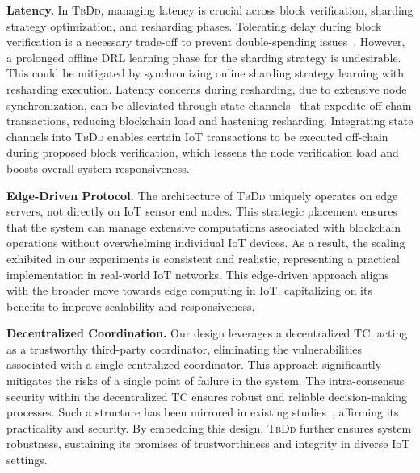 \noindent\textbf{Latency.}
In \textsc{TbDd}, managing latency is crucial across block verification, sharding strategy optimization, and resharding phases. Tolerating delay during block verification is a necessary trade-off to prevent double-spending issues~\cite{nakamoto2008bitcoin}. However, a prolonged offline DRL learning phase for the sharding strategy is undesirable. 
This could be mitigated by synchronizing online sharding strategy learning with resharding execution. Latency concerns during resharding, due to extensive node synchronization, can be alleviated through state channels~\cite{miller2019sprites} that expedite off-chain transactions, reducing blockchain load and hastening resharding.
Integrating state channels into \textsc{TbDd} enables certain IoT transactions to be executed off-chain during proposed block verification, which lessens the node verification load and boosts overall system responsiveness.

\smallskip
\noindent\textbf{Edge-Driven Protocol.}
The architecture of \textsc{TbDd} uniquely operates on edge servers, not directly on IoT sensor end nodes. This strategic placement ensures that the system can manage extensive computations associated with blockchain operations without overwhelming individual IoT devices. As a result, the scaling exhibited in our experiments is consistent and realistic, representing a practical implementation in real-world IoT networks. This edge-driven approach aligns with the broader move towards edge computing in IoT, capitalizing on its benefits to improve scalability and responsiveness.

\smallskip
\noindent\textbf{Decentralized Coordination.}
Our design leverages a decentralized TC, acting as a trustworthy third-party coordinator, eliminating the vulnerabilities associated with a single centralized coordinator. This approach significantly mitigates the risks of a single point of failure in the system. The intra-consensus security within the decentralized TC ensures robust and reliable decision-making processes. Such a structure has been mirrored in existing studies~\cite{luu2016secure, kokoris2018omniledger}, affirming its practicality and security. By embedding this design, \textsc{TbDd} further ensures system robustness, sustaining its promises of trustworthiness and integrity in diverse IoT settings.
